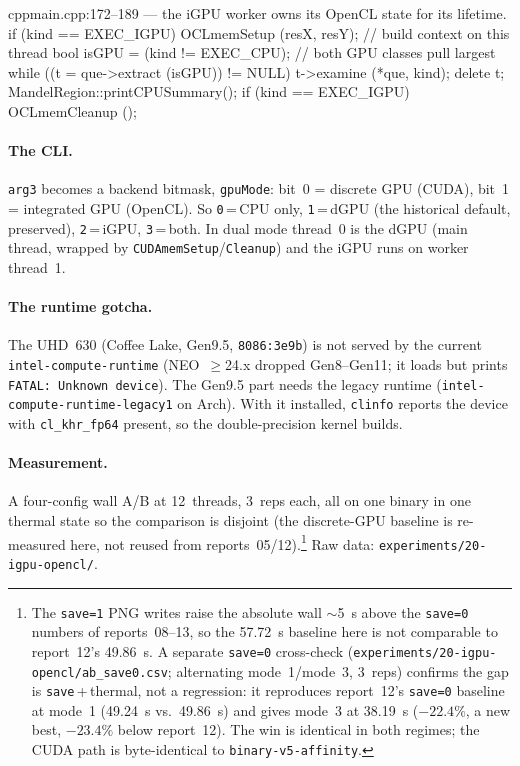 \documentclass[
	english,
	letterpaper, oneside
]{article}
\begin{document}
\begin{sourcecode}{cpp}{main.cpp:172--189 --- the iGPU worker owns its OpenCL state for its lifetime.}
if (kind == EXEC_IGPU) OCLmemSetup (resX, resY);     // build context on this thread
bool isGPU = (kind != EXEC_CPU);                     // both GPU classes pull largest
while ((t = que->extract (isGPU)) != NULL) { t->examine (*que, kind); delete t; }
MandelRegion::printCPUSummary();
if (kind == EXEC_IGPU) OCLmemCleanup ();
\end{sourcecode}

\paragraph{The CLI.} \texttt{arg3} becomes a backend bitmask, \texttt{gpuMode}:
bit~0 = discrete GPU (CUDA), bit~1 = integrated GPU (OpenCL). So \texttt{0}\,=\,CPU
only, \texttt{1}\,=\,dGPU (the historical default, preserved), \texttt{2}\,=\,iGPU,
\texttt{3}\,=\,both. In dual mode thread~0 is the dGPU (main thread, wrapped by
\texttt{CUDAmemSetup}/\texttt{Cleanup}) and the iGPU runs on worker thread~1.

\paragraph{The runtime gotcha.} The UHD~630 (Coffee Lake, Gen9.5,
\texttt{8086:3e9b}) is not served by the current
\texttt{intel-compute-runtime} (NEO~$\geq$24.x dropped Gen8--Gen11; it loads but
prints \texttt{FATAL: Unknown device}). The Gen9.5 part needs the legacy
runtime (\texttt{intel-compute-runtime-legacy1} on Arch). With it installed,
\texttt{clinfo} reports the device with \texttt{cl\_khr\_fp64} present, so the
double-precision kernel builds.

\paragraph{Measurement.} A four-config wall A/B at 12~threads, 3~reps each, all on
one binary in one thermal state so the comparison is disjoint (the discrete-GPU
baseline is re-measured here, not reused from reports~05/12).\footnote{The \texttt{save=1} PNG writes raise the
absolute wall $\sim$5~s above the \texttt{save=0} numbers of reports~08--13, so the
57.72~s baseline here is not comparable to report~12's 49.86~s. A separate
\texttt{save=0} cross-check (\texttt{experiments/20-igpu-opencl/ab\_save0.csv};
alternating mode~1/mode~3, 3~reps) confirms the gap is \texttt{save}\,+\,thermal, not
a regression: it reproduces report~12's \texttt{save=0} baseline at mode~1
(49.24~s vs.\ 49.86~s) and gives mode~3 at 38.19~s ($-22.4\%$, a new
best, $-23.4\%$ below report~12). The win is identical in both regimes; the CUDA path
is byte-identical to \texttt{binary-v5-affinity}.} Raw data:
\texttt{experiments/20-igpu-opencl/}.
\end{document}
